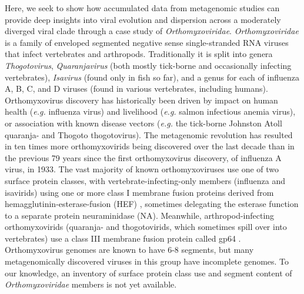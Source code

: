 \documentclass[11pt,twocolumn]{article}
\begin{document}
Here, we seek to show how accumulated data from metagenomic studies can provide deep insights into viral evolution and dispersion across a moderately diverged viral clade through a case study of \textit{Orthomyxoviridae}. \textit{Orthomyxoviridae} is a family of enveloped segmented negative sense single-stranded RNA viruses that infect vertebrates and arthropods.
Traditionally it is split into genera \textit{Thogotovirus}, \textit{Quaranjavirus} (both mostly tick-borne and occasionally infecting vertebrates), \textit{Isavirus} (found only in fish so far), and a genus for each of influenza A, B, C, and D viruses (found in various vertebrates, including humans).
Orthomyxovirus discovery has historically been driven by impact on human health (\textit{e.g.} influenza virus) and livelihood (\textit{e.g.} salmon infectious anemia virus), or association with known disease vectors (\textit{e.g.} the tick-borne Johnston Atoll quaranja- and Thogoto thogotovirus). The metagenomic revolution has resulted in ten times more orthomyxovirids being discovered over the last decade than in the previous 79 years since the first orthomyxovirus discovery, of influenza A virus, in 1933. The vast majority of known orthomyxoviruses use one of two surface protein classes, with vertebrate-infecting-only members (influenza and isavirids) using one or more class I membrane fusion proteins derived from hemagglutinin-esterase-fusion (HEF) \citep{parry_divergent_2020}, sometimes delegating the esterase function to a separate protein neuraminidase (NA). Meanwhile, arthropod-infecting orthomyxovirids (quaranja- and thogotovirids, which sometimes spill over into vertebrates) use a class III membrane fusion protein called gp64 \citep{garry_proteomics_2008}. Orthomyxovirus genomes are known to have 6-8 segments, but many metagenomically discovered viruses in this group have incomplete genomes. To our knowledge, an inventory of surface protein class use and segment content of \textit{Orthomyxoviridae} members is not yet available.
\end{document}
